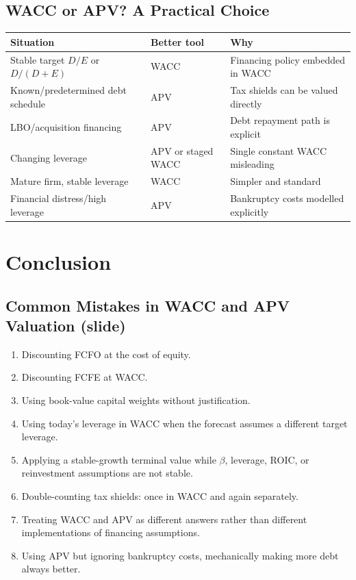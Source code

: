 \subsection{WACC or APV? A Practical Choice}

\begin{center}
\small
\begin{tabular}{@{}lll@{}}
\toprule
\textbf{Situation} & \textbf{Better tool} & \textbf{Why}\\
\midrule
Stable target $D/E$ or $D/(D+E)$ & WACC & Financing policy embedded in WACC\\
Known/predetermined debt schedule & APV & Tax shields can be valued directly\\
LBO/acquisition financing & APV & Debt repayment path is explicit\\
Changing leverage & APV or staged WACC & Single constant WACC misleading\\
Mature firm, stable leverage & WACC & Simpler and standard\\
Financial distress/high leverage & APV & Bankruptcy costs modelled explicitly\\
\bottomrule
\end{tabular}
\end{center}

\section{Conclusion}

\subsection{Common Mistakes in WACC and APV Valuation (slide)}
\begin{enumerate}
  \item Discounting FCFO at the cost of equity.
  \item Discounting FCFE at WACC.
  \item Using book-value capital weights without justification.
  \item Using today's leverage in WACC when the forecast assumes a different target leverage.
  \item Applying a stable-growth terminal value while $\beta$, leverage, ROIC, or reinvestment assumptions are not stable.
  \item Double-counting tax shields: once in WACC and again separately.
  \item Treating WACC and APV as different answers rather than different implementations of financing assumptions.
  \item Using APV but ignoring bankruptcy costs, mechanically making more debt always better.
\end{enumerate}

